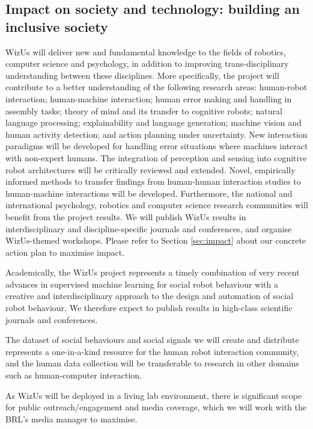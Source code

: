 \documentclass[11pt]{report}
\newcommand{\project}{WizUs\xspace}
\begin{document}
\subsection{Impact on society and technology: building an inclusive society}


\project will deliver new and fundamental knowledge to the fields of robotics,
computer science and psychology, in addition to improving trans-disciplinary
understanding between these disciplines. More specifically, the project will
contribute to a better understanding of the following research areas:
human-robot interaction; human-machine interaction; human error making and
handling in assembly tasks; theory of mind and its transfer to cognitive robots;
natural language processing; explainability and language generation; machine
vision and human activity detection; and action planning under uncertainty. New
interaction paradigms will be developed for handling error situations where
machines interact with non-expert humans. The integration of perception and
sensing into cognitive robot architectures will be critically reviewed and
extended. Novel, empirically informed methods to transfer findings from
human-human interaction studies to human-machine interactions will be developed.
Furthermore, the national and international psychology, robotics and computer
science research communities will benefit from the project results. We will
publish \project results in interdisciplinary and discipline-specific journals
and conferences, and organise \project-themed workshops. Please refer to Section
\ref{sec:impact} about our concrete action plan to maximise impact. 




Academically, the \project project represents a timely combination of
very recent advances in supervised machine learning for social robot
behaviour with a creative and interdisciplinary approach to the design
and automation of social robot behaviour. We therefore expect to publish
results in high-class scientific journals and conferences.

The dataset of social behaviours and social signals we will create and
distribute represents a one-in-a-kind resource for the human robot
interaction community, and the human data collection will be
transferable to research in other domains such as human-computer
interaction.

As \project will be deployed in a living lab environment, there is
significant scope for public outreach/engagement and media coverage,
which we will work with the BRL's media manager to maximise.
\end{document}
